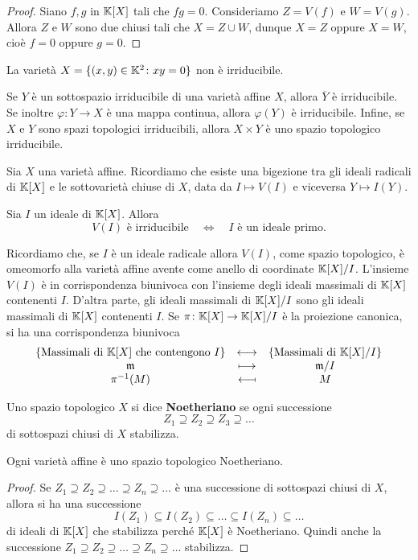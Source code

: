 \begin{proof}
    Siano $f,g$ in $\mathbb{K}[X]$ tali che $f g=0$. Consideriamo $Z=V(f)$ e $W=V(g)$. Allora $Z$ e $W$ sono due chiusi tali che $X=Z\cup W$, dunque $X=Z$ oppure $X=W$, cioè $f=0$ oppure $g=0$.
\end{proof}

\begin{example}
    La variet\`a $X=\{(x,y)\in \mathbb{K}^2 \colon xy=0\}$ non \`e irriducibile.
\end{example}

\begin{remark}
    Se $Y$ è un sottospazio irriducibile di una varietà affine $X$, allora $\overline{Y}$ è irriducibile. Se inoltre $\varphi\colon Y \to X$ è una mappa continua, allora $\varphi(Y)$ è irriducibile. Infine, se $X$ e $Y$ sono spazi topologici irriducibili, allora $X\times Y$ è uno spazio topologico irriducibile.
\end{remark}

Sia $X$ una varietà affine. Ricordiamo che esiste una bigezione tra gli ideali radicali di $\mathbb{K}[X]$ e le sottovarietà chiuse di $X$, data da $I \mapsto V(I)$ e viceversa $Y\mapsto I(Y)$. 

\begin{remark}
    Sia $I$ un ideale di $\mathbb{K}[X]$. Allora \[V(I) \text{ è irriducibile} \quad \iff \quad I \text{ è un ideale primo.}\]
\end{remark}

Ricordiamo che, se $I$ è un ideale radicale allora $V(I)$, come spazio topologico, è omeomorfo alla varietà affine avente come anello di coordinate $\mathbb{K}[X]/I$. L'insieme $V(I)$ è in corrispondenza biunivoca con l'insieme degli ideali massimali di $\mathbb{K}[X]$ contenenti $I$. D'altra parte, gli ideali massimali di $\mathbb{K}[X]/I$ sono gli ideali massimali di $\mathbb{K}[X]$ contenenti $I$. Se $\pi\colon \mathbb{K}[X]\to \mathbb{K}[X]/I$ è la proiezione canonica, si ha una corrispondenza biunivoca 
\[\begin{array}{ccc} {\left\{{\text{Massimali di $\mathbb{K}[X]$ che contengono $I$}}\right\}} & \longleftrightarrow & {\left\{{\text{Massimali di $\mathbb{K}[X]/I$}}\right\}}\\ {\mathfrak{m}} & \longmapsto & {\mathfrak{m}/I}\\ {\pi^{-1}(M)} & \longmapsfrom & {M} \end{array}\]


\begin{definition}
    Uno spazio topologico $X$ si dice \textbf{Noetheriano} se ogni successione  \[Z_1\supseteq Z_2 \supseteq Z_3 \supseteq \ldots\]
    di sottospazi chiusi di $X$ stabilizza.
\end{definition}

\begin{remark}
    Ogni varietà affine è uno spazio topologico Noetheriano.
\end{remark}
\begin{proof}
    Se $Z_1\supseteq Z_2 \supseteq \ldots \supseteq Z_n \supseteq\ldots$ è una successione di sottospazi chiusi di $X$, allora si ha una successione  \[I(Z_1)\subseteq I(Z_2) \subseteq \ldots \subseteq I(Z_n)\subseteq \ldots\]  di ideali di $\mathbb{K}[X]$ che stabilizza perché $\mathbb{K}[X]$ è Noetheriano. Quindi anche la successione $Z_1\supseteq Z_2 \supseteq \ldots \supseteq Z_n \supseteq\ldots$ stabilizza.
\end{proof}

